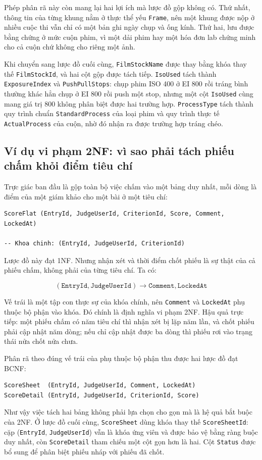 Phép phân rã này còn mang lại hai lợi ích mà lược đồ gộp không có. Thứ nhất, thông tin của từng khung nằm ở thực thể yếu \texttt{Frame}, nên một khung được nộp ở nhiều cuộc thi vẫn chỉ có một bản ghi ngày chụp và ống kính. Thứ hai, lưu được bằng chứng ở mức cuộn phim, vì một dải phim hay một hóa đơn lab chứng minh cho cả cuộn chứ không cho riêng một ảnh.

Khi chuyển sang lược đồ cuối cùng, \texttt{FilmStockName} được thay bằng khóa thay thế \texttt{FilmStockId}, và hai cột gộp được tách tiếp. \texttt{IsoUsed} tách thành \texttt{ExposureIndex} và \texttt{PushPullStops}: chụp phim ISO 400 ở EI 800 rồi tráng bình thường khác hẳn chụp ở EI 800 rồi push một stop, nhưng một cột \texttt{IsoUsed} cùng mang giá trị 800 không phân biệt được hai trường hợp. \texttt{ProcessType} tách thành quy trình chuẩn \texttt{StandardProcess} của loại phim và quy trình thực tế \texttt{ActualProcess} của cuộn, nhờ đó nhận ra được trường hợp tráng chéo.

\subsection{Ví dụ vi phạm 2NF: vì sao phải tách phiếu chấm khỏi điểm tiêu chí}

Trực giác ban đầu là gộp toàn bộ việc chấm vào một bảng duy nhất, mỗi dòng là điểm của một giám khảo cho một bài ở một tiêu chí:


\begin{lstlisting}[style=sqlstyle]
ScoreFlat (EntryId, JudgeUserId, CriterionId, Score, Comment, LockedAt)

-- Khoa chinh: (EntryId, JudgeUserId, CriterionId)
\end{lstlisting}


Lược đồ này đạt 1NF. Nhưng nhận xét và thời điểm chốt phiếu là sự thật của cả phiếu chấm, không phải của từng tiêu chí. Ta có:

\[ (\texttt{EntryId}, \texttt{JudgeUserId}) \rightarrow \texttt{Comment}, \texttt{LockedAt} \]

Vế trái là một tập con thực sự của khóa chính, nên \texttt{Comment} và \texttt{LockedAt} phụ thuộc bộ phận vào khóa. Đó chính là định nghĩa vi phạm 2NF. Hậu quả trực tiếp: một phiếu chấm có năm tiêu chí thì nhận xét bị lặp năm lần, và chốt phiếu phải cập nhật năm dòng; nếu chỉ cập nhật được ba dòng thì phiếu rơi vào trạng thái nửa chốt nửa chưa.

Phân rã theo đúng vế trái của phụ thuộc bộ phận thu được hai lược đồ đạt BCNF:


\begin{lstlisting}[style=sqlstyle]
ScoreSheet  (EntryId, JudgeUserId, Comment, LockedAt)
ScoreDetail (EntryId, JudgeUserId, CriterionId, Score)
\end{lstlisting}


Như vậy việc tách hai bảng không phải lựa chọn cho gọn mà là hệ quả bắt buộc của 2NF. Ở lược đồ cuối cùng, \texttt{ScoreSheet} dùng khóa thay thế \texttt{ScoreSheetId}: cặp (\texttt{EntryId}, \texttt{JudgeUserId}) vẫn là khóa ứng viên và được bảo vệ bằng ràng buộc duy nhất, còn \texttt{ScoreDetail} tham chiếu một cột gọn hơn là hai. Cột \texttt{Status} được bổ sung để phân biệt phiếu nháp với phiếu đã chốt.

